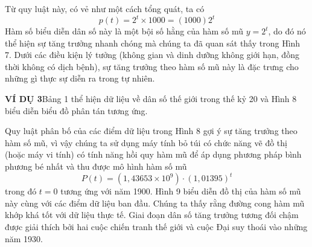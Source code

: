 \hfill
\begin{minipage}[t]{0.708\textwidth}
    \fontsize{9.3pt}{13.4pt}\selectfont
    Từ quy luật này, có vẻ như một cách tổng quát, ta có
    \[
    p(t) = 2^t \times 1000 = (1000)2^t
    \]
    Hàm số biểu diễn dân số này là một bội số hằng của hàm số mũ $y = 2^t$, do đó nó thể hiện sự tăng trưởng nhanh chóng mà chúng ta đã quan sát thấy trong Hình 7. Dưới các điều kiện lý tưởng (không gian và dinh dưỡng không giới hạn, đồng thời không có dịch bệnh), sự tăng trưởng theo hàm số mũ này là đặc trưng cho những gì thực sự diễn ra trong tự nhiên.

    \vspace{6pt}
    \noindent
    \textbf{\textsf{\color{stewartcyan}VÍ DỤ 3}}\quad Bảng 1 thể hiện dữ liệu về dân số thế giới trong thế kỷ 20 và Hình 8 biểu diễn biểu đồ phân tán tương ứng.
    
    Quy luật phân bố của các điểm dữ liệu trong Hình 8 gợi ý sự tăng trưởng theo hàm số mũ, vì vậy chúng ta sử dụng máy tính bỏ túi có chức năng vẽ đồ thị (hoặc máy vi tính) có tính năng hồi quy hàm mũ để áp dụng phương pháp bình phương bé nhất và thu được mô hình hàm số mũ
    \[
    P(t) = (1{,}43653 \times 10^9) \cdot (1{,}01395)^t
    \]
    trong đó $t = 0$ tương ứng với năm 1900. Hình 9 biểu diễn đồ thị của hàm số mũ này cùng với các điểm dữ liệu ban đầu. Chúng ta thấy rằng đường cong hàm mũ khớp khá tốt với dữ liệu thực tế. Giai đoạn dân số tăng trưởng tương đối chậm được giải thích bởi hai cuộc chiến tranh thế giới và cuộc Đại suy thoái vào những năm 1930.

    \vspace{4pt}
    \begin{center}
\end{center}
\end{minipage}
